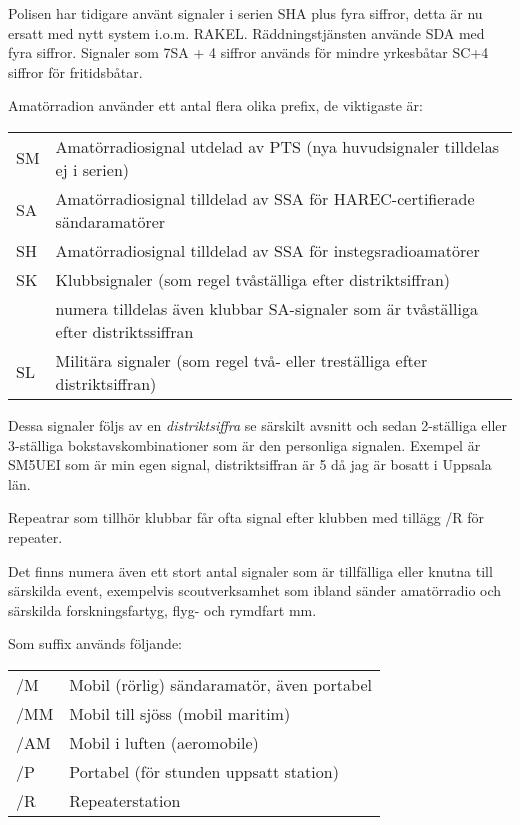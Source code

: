 Polisen har tidigare använt signaler i serien SHA plus fyra siffror, detta är
nu ersatt med nytt system i.o.m. RAKEL. Räddningstjänsten använde SDA med fyra
siffror. Signaler som 7SA + 4 siffror används för mindre yrkesbåtar SC+4
siffror för fritidsbåtar.

Amatörradion använder ett antal flera olika prefix, de viktigaste är:

\begin{tabular}{ll}
  SM & Amatörradiosignal utdelad av PTS (nya huvudsignaler tilldelas ej i serien)          \\
  SA & Amatörradiosignal tilldelad av SSA för HAREC-certifierade sändaramatörer            \\
  SH & Amatörradiosignal tilldelad av SSA för instegsradioamatörer                         \\
  SK & Klubbsignaler (som regel tvåställiga efter distriktsiffran)                         \\
     & numera tilldelas även klubbar SA-signaler som är tvåställiga efter distriktssiffran \\
  SL & Militära signaler (som regel två- eller treställiga efter distriktsiffran)
\end{tabular}

Dessa signaler följs av en \textit{distriktsiffra} se särskilt avsnitt och
sedan 2-ställiga eller 3-ställiga bokstavskombinationer som är den personliga
signalen. Exempel är SM5UEI som är min egen signal, distriktsiffran är 5 då
jag är bosatt i Uppsala län.

Repeatrar som tillhör klubbar får ofta signal efter klubben med tillägg /R för
repeater.

Det finns numera även ett stort antal signaler som är tillfälliga eller knutna
till särskilda event, exempelvis scoutverksamhet som ibland sänder amatörradio
och särskilda forskningsfartyg, flyg- och rymdfart mm.

Som suffix används följande:

\begin{tabular}{ll}
	/M  & Mobil (rörlig) sändaramatör, även portabel \\
	/MM & Mobil till sjöss (mobil maritim)           \\
	/AM & Mobil i luften (aeromobile)                \\
	/P  & Portabel (för stunden uppsatt station)     \\
	/R  & Repeaterstation
\end{tabular}

